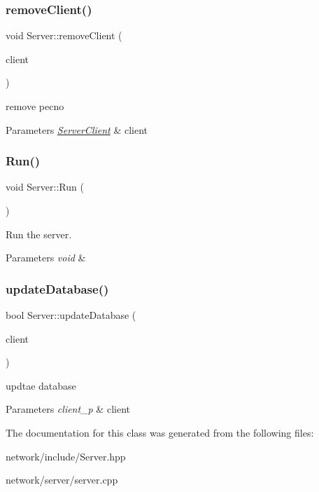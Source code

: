 \subsubsection{\texorpdfstring{remove\+Client()}{removeClient()}}
{\footnotesize\ttfamily void Server\+::remove\+Client (\begin{DoxyParamCaption}\item[{\hyperlink{class_server_client}{Server\+Client}}]{client }\end{DoxyParamCaption})}



remove pecno 


\begin{DoxyParams}{Parameters}
{\em \hyperlink{class_server_client}{Server\+Client}} & client \\
\hline
\end{DoxyParams}
\mbox{\label{classns_1_1_server_ac0ac436c081e25c992d2b6dd1632ff71}} 
\subsubsection{\texorpdfstring{Run()}{Run()}}
{\footnotesize\ttfamily void Server\+::\+Run (\begin{DoxyParamCaption}{ }\end{DoxyParamCaption})}



Run the server. 


\begin{DoxyParams}{Parameters}
{\em void} & \\
\hline
\end{DoxyParams}
\mbox{\label{classns_1_1_server_a8b83ee853238667ba56c4bb1f064364e}} 
\subsubsection{\texorpdfstring{update\+Database()}{updateDatabase()}}
{\footnotesize\ttfamily bool Server\+::update\+Database (\begin{DoxyParamCaption}\item[{client\+\_\+p}]{client }\end{DoxyParamCaption})}



updtae database 


\begin{DoxyParams}{Parameters}
{\em client\+\_\+p} & client \\
\hline
\end{DoxyParams}


The documentation for this class was generated from the following files\+:\begin{DoxyCompactItemize}
\item 
network/include/Server.\+hpp\item 
network/server/server.\+cpp\end{DoxyCompactItemize}
